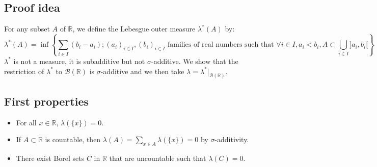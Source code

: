 \subsection*{Proof idea}%
For any subset $A$ of $\mathbb{R}$, we define the Lebesgue outer measure $\lambda^*(A)$ by:
\[
\lambda^*(A) = \inf \left\{ \sum_{i \in I} (b_i - a_i) ; (a_i)_{i \in I}, (b_i)_{i \in I} \text{ families of real numbers such that } \forall i \in I, a_i < b_i, A \subset \bigcup_{i \in I} ]a_i, b_i[ \right\}
\]
$\lambda^*$ is not a measure, it is subadditive but not $\sigma$-additive. We show that the restriction of $\lambda^*$ to $\mathcal{B}(\mathbb{R})$ is $\sigma$-additive and we then take $\lambda = \lambda^*|_{\mathcal{B}(\mathbb{R})}$.%
\subsection*{First properties}%

\begin{itemize}
    \item For all $x \in \mathbb{R}$, $\lambda(\{x\}) = 0$.
    \item If $A \subset \mathbb{R}$ is countable, then $\lambda(A) = \sum_{x \in A} \lambda(\{x\}) = 0$ by $\sigma$-additivity.
    \item There exist Borel sets $C$ in $\mathbb{R}$ that are uncountable such that $\lambda(C)=0$.
\end{itemize}
